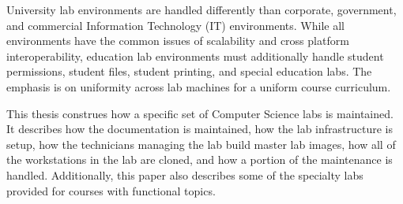 \thispagestyle{empty}

University lab environments are handled differently than corporate, government, and commercial Information Technology (IT) environments.  While all environments have the common issues of scalability and cross platform interoperability, education lab environments must additionally handle student permissions, student files, student printing, and special education labs.  The emphasis is on uniformity across lab machines for a uniform course curriculum. 

This thesis construes how a specific set of Computer Science labs is maintained.  It describes how the documentation is maintained, how the lab infrastructure is setup, how the technicians managing the lab build master lab images, how all of the workstations in the lab are cloned, and how a portion of the maintenance is handled.  Additionally, this paper also describes some of the specialty labs provided for courses with functional topics. 
